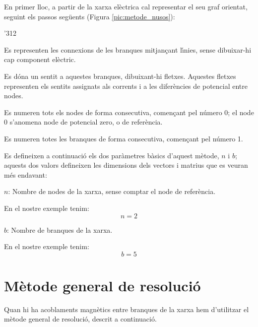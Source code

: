 En primer lloc, a partir de la xarxa el\`{e}ctrica
cal representar el seu graf orientat, seguint els passos seg\"{u}ents
(Figura \vref{pic:metode_nusos}):
\begin{dingautolist}{'312}
   \item Es representen les connexions de les branques mitjan\c{c}ant l\'{\i}nies, sense dibuixar-hi cap component el\`{e}ctric.
   \item Es d\'{o}na un sentit a aquestes branques, dibuixant-hi fletxes. Aquestes fletxes representen els sentits assignats als corrents i a les difer\`{e}ncies de potencial entre nodes.
   \item Es numeren tots els nodes de forma consecutiva, comen\c{c}ant pel n\'{u}mero 0; el node 0 s'anomena node de potencial zero, o de refer\`{e}ncia.
   \item Es numeren totes les branques de forma consecutiva, comen\c{c}ant pel n\'{u}mero 1.
\end{dingautolist}

Es defineixen a continuaci\'{o} els dos
par\`{a}metres b\`{a}sics d'aquest m\`{e}tode, $n$ i $b$; aquests dos valors
defineixen les dimensions dels vectors i matrius que es veuran m\'{e}s
endavant:
\begin{list}{}
   {\setlength{\labelwidth}{7mm} \setlength{\leftmargin}{9mm} \setlength{\labelsep}{2mm}}
   \item[$n$:] Nombre de nodes de la xarxa, sense comptar el node de refer\`{e}ncia.

   En el nostre exemple tenim:
   \[ n=2 \]

   \item[$b$:] Nombre de branques de la xarxa.

   En el nostre exemple tenim:
   \[ b=5 \]
\end{list}

\section{M\`{e}tode general de resoluci\'{o}}

Quan hi ha acoblaments
magn\`{e}tics entre branques de la xarxa hem d'utilitzar el m\`{e}tode
general de resoluci\'{o}, descrit a continuaci\'{o}.

